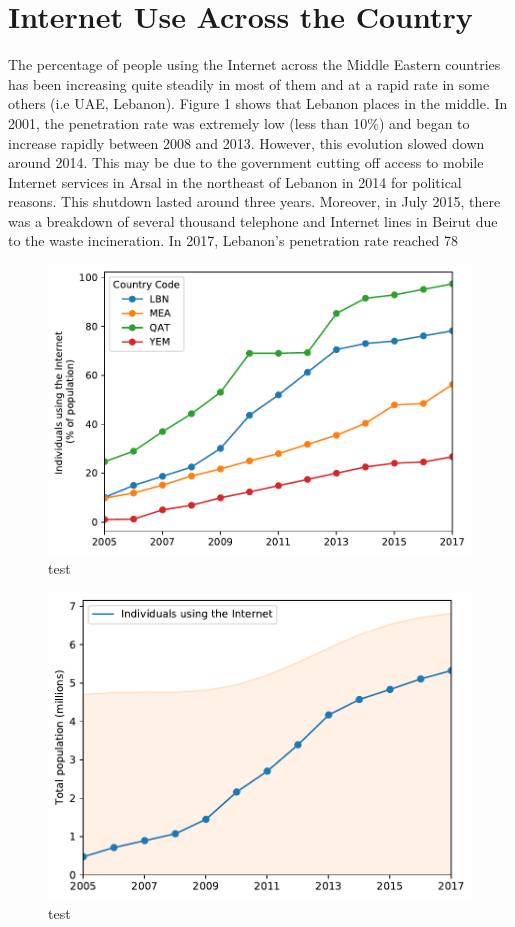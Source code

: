 \documentclass[a4paper,titlepage]{article}
\begin{document}
\section{Internet Use Across the Country}
The percentage of people using the Internet across the Middle Eastern countries has been increasing quite steadily in most of them and at a rapid rate in some others (i.e UAE, Lebanon). Figure 1 shows that Lebanon places in the middle.
In 2001, the penetration rate was extremely low (less than 10\%) and began to increase rapidly between 2008 and 2013. However, this evolution slowed down around 2014. This may be due to the government cutting off access to mobile Internet services in Arsal in the northeast of Lebanon in 2014 for political reasons. This shutdown lasted around three years. Moreover, in July 2015, there was a breakdown of several thousand telephone and Internet lines in Beirut due to the waste incineration.
In 2017, Lebanon’s penetration rate reached 78%

\begin{figure}
    \centering
    \includegraphics[width=0.8\linewidth]{../output/internet-users.pdf}
    \caption{test}
\end{figure}

\begin{figure}
    \centering
    \includegraphics[width=0.8\linewidth]{../output/population-internet-lbn.pdf}
    \caption{test}
\end{figure}
\end{document}
